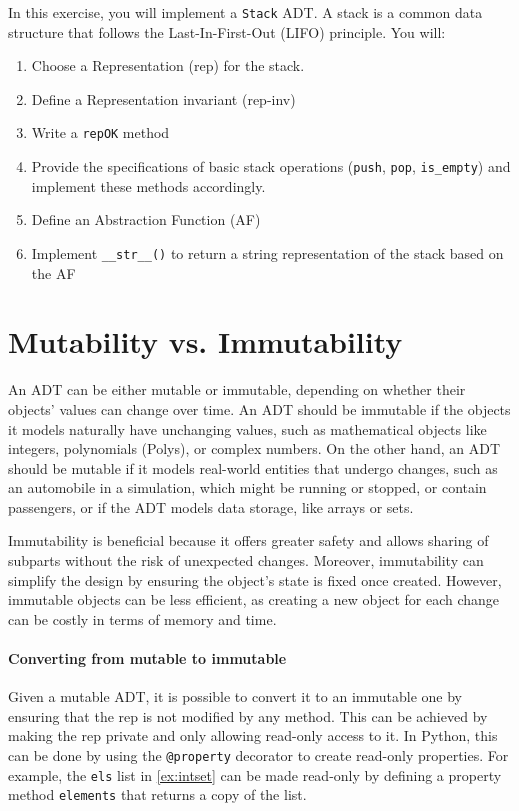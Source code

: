 \documentclass[oneside,11pt,dvipsnames]{book}
\newcommand{\code}[1]{\texttt{#1}}
\begin{document}
In this exercise, you will implement a \code{Stack} ADT. A stack is a common data structure that follows the Last-In-First-Out (LIFO) principle. You will:
\begin{enumerate}
\item Choose a Representation (rep) for the stack.
\item Define a Representation invariant (rep-inv)
\item Write a \code{repOK} method
\item Provide the specifications of basic stack operations (\code{push}, \code{pop}, \code{is\_empty}) and implement these methods accordingly.
\item Define an Abstraction Function (AF)
\item Implement \code{\_\_str\_\_()} to return a string representation of the stack based on the AF
\end{enumerate}

\section{Mutability vs. Immutability}\label{sec:mutability-vs-immutability}

An ADT can be either mutable or immutable, depending on whether their objects' values can change over time. An ADT should be immutable if the objects it models naturally have unchanging values, such as mathematical objects like integers, polynomials (Polys), or complex numbers. On the other hand, an ADT should be mutable if it models real-world entities that undergo changes, such as an automobile in a simulation, which might be running or stopped, or contain passengers, or if the ADT models data storage, like arrays or sets.

Immutability is beneficial because it offers greater safety and allows sharing of subparts without the risk of unexpected changes. Moreover, immutability can simplify the design by ensuring the object’s state is fixed once created. However, immutable objects can be less efficient, as creating a new object for each change can be costly in terms of memory and time.

\paragraph{Converting from mutable to immutable} 
Given a mutable ADT, it is possible to convert it to an immutable one by ensuring that the rep is not modified by any method. This can be achieved by making the rep private and only allowing read-only access to it. In Python, this can be done by using the \code{@property} decorator to create read-only properties. For example, the \code{els} list in \autoref{ex:intset} can be made read-only by defining a property method \code{elements} that returns a copy of the list.
\end{document}
